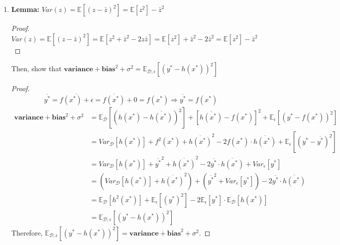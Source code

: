 \documentclass{article}
\begin{document}
 \begin{enumerate}[(1)]
\item \textbf{Lemma:} $Var(z) = \mathbb{E}[(z-\bar z)^2] = \mathbb{E}[z^2]-\bar{z}^2$
\begin{proof}
$$Var(z) = \mathbb{E}[(z-\bar z)^2] = \mathbb{E}[z^2+\bar z^2 - 2z\bar z] = \mathbb{E}[z^2] + \bar z^2 - 2\bar z^2 = \mathbb{E}[z^2]-\bar{z}^2$$
\end{proof}
Then, show that $\textbf{variance}+\textbf{bias}^2+\sigma^2 = \mathbb{E}_{\mathcal{D},\epsilon}[(y^*-h(x^*))^2]$
\begin{proof}
	$$\overline{y^*} = \overline{f(x^*) + \epsilon} = \overline{f(x^*)} + 0 = f(x^*)\Rightarrow \overline{y^*} = f(x^*)$$
	\begin{equation}
		\begin{aligned}
		\textbf{variance}+\textbf{bias}^2+\sigma^2 &= \mathbb{E}_{\mathcal{D}}[(h(x^*)-\overline{h(x^*)})^2] + [\overline{h(x^*)}-f(x^*)]^2 + \mathbb{E}_{\epsilon}[(y^*-f(x^*))^2]\\
		&=Var_{\mathcal{D}}[h(x^*)] + f^2(x^*) + \overline{h(x^*)}^2 - 2f(x^*)\cdot \overline{h(x^*)} + \mathbb{E}_{\epsilon}[(y^*-\overline{y^*})^2]\\
		&=Var_{\mathcal{D}}[h(x^*)] + \overline{y^*}^2 + \overline{h(x^*)}^2 - 2\overline{y^*}\cdot \overline{h(x^*)} + Var_{\epsilon}[y^*]\\
		&=(Var_{\mathcal{D}}[h(x^*)] + \overline{h(x^*)}^2) + (\overline{y^*}^2 + Var_{\epsilon}[y^*]) - 2\overline{y^*}\cdot \overline{h(x^*)}\\
		&=\mathbb{E}_{\mathcal{D}}[h^2(x^*)] + \mathbb{E}_{\epsilon}[(y^*)^2] - 2\mathbb{E}_{\epsilon}[y^*]\cdot \mathbb{E}_{\mathcal{D}}[h(x^*)]\\
		&=\mathbb{E}_{\mathcal{D},\epsilon}[(y^*-h(x^*))^2]
		\end{aligned}
	\end{equation}
	Therefore, $\mathbb{E}_{\mathcal{D},\epsilon}[(y^*-h(x^*))^2] = \textbf{variance}+\textbf{bias}^2+\sigma^2$.
\end{proof}
\end{enumerate}
\end{document}
